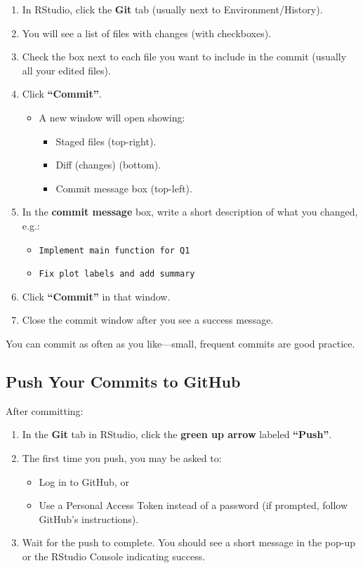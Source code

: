 \documentclass[11pt]{scrartcl}
\begin{document}
\begin{enumerate}[label=\arabic*., nosep]
  \item In RStudio, click the \textbf{Git} tab (usually next to Environment/History).
  \item You will see a list of files with changes (with checkboxes).
  \item Check the box next to each file you want to include in the commit (usually all your edited files).
  \item Click \textbf{``Commit''}.
    \begin{itemize}[nosep]
      \item A new window will open showing:
      \begin{itemize}[nosep]
        \item Staged files (top-right).
        \item Diff (changes) (bottom).
        \item Commit message box (top-left).
      \end{itemize}
    \end{itemize}
  \item In the \textbf{commit message} box, write a short description of what you changed, e.g.:
    \begin{itemize}[nosep]
      \item \texttt{Implement main function for Q1}
      \item \texttt{Fix plot labels and add summary}
    \end{itemize}
  \item Click \textbf{``Commit''} in that window.
  \item Close the commit window after you see a success message.
\end{enumerate}

You can commit as often as you like---small, frequent commits are good practice.

\subsection{Push Your Commits to GitHub}

After committing:

\begin{enumerate}[label=\arabic*., nosep]
  \item In the \textbf{Git} tab in RStudio, click the \textbf{green up arrow} labeled \textbf{``Push''}.
  \item The first time you push, you may be asked to:
    \begin{itemize}[nosep]
      \item Log in to GitHub, or
      \item Use a Personal Access Token instead of a password (if prompted, follow GitHub's instructions).
    \end{itemize}
  \item Wait for the push to complete. You should see a short message in the pop-up or the RStudio Console indicating success.
\end{enumerate}
\end{document}
